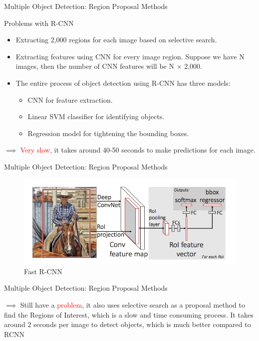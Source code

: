 \documentclass[aspectratio=169]{beamer}
\begin{document}
\begin{frame}{Multiple Object Detection: Region Proposal Methods}
\begin{alertblock}{Problems with R-CNN}

\begin{itemize}
    \item Extracting 2,000 regions for each image based on selective search.
    \item Extracting features using CNN for every image region. Suppose we have N images, then the number of CNN features will be N $\times$ 2,000.
    \item The entire process of object detection using R-CNN has three models: 
    \begin{itemize}
        \item CNN for feature extraction.
        \item Linear SVM classifier for identifying objects.
        \item Regression model for tightening the bounding boxes.
    \end{itemize}
\end{itemize}
\end{alertblock}

$\implies$ \textcolor{red}{Very slow}, it takes around 40-50 seconds to make predictions for each image.
\end{frame}

\begin{frame}{Multiple Object Detection: Region Proposal Methods}
\begin{figure}
    \centering
    \includegraphics[scale=.4]{demo/fastrcnn.png}
    \caption{Fast R-CNN}
\end{figure}
\end{frame}

\begin{frame}{Multiple Object Detection: Region Proposal Methods}

$\implies$ Still have a \textcolor{red}{problem}, it also uses selective search as a proposal method to find the Regions of Interest, which is a slow and time consuming process. It takes around 2 seconds per image to detect objects, which is much better compared to RCNN
\end{frame}
\end{document}
